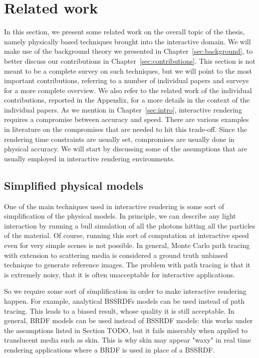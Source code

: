 \chapter{Related work}




%
\label{sec:related}
%
In this section, we present some related work on the overall topic of the thesis, namely physically based techniques brought into the interactive domain. We will make use of the background theory we presented in Chapter~\ref{sec:background}, to better discuss our contributions in Chapter~\ref{sec:contributions}. This section is not meant to be a complete survey on such techniques, but we will point to the most important contributions, referring to a number of individual papers and surveys for a more complete overview. We also refer to the related work of the individual contributions, reported in the Appendix, for a more details in the context of the individual papers. 
%
As we mention in Chapter~\ref{sec:intro}, interactive rendering requires a compromise between accuracy and speed. There are various examples in literature on the compromises that are needed to hit this trade-off. Since the rendering time constraints are usually set, compromises are usually done in physical accuracy. We will start by discussing some of the assumptions that are usually employed in interactive rendering environments. 
%
\section{Simplified physical models}
One of the main techniques used in interactive rendering is some sort of simplification of the physical models. In principle, we can describe any light interaction by running a bull simulation of all the photons hitting all the particles of the material. Of course, running this sort of computation at interactive speed even for very simple scenes is not  possible. In general, Monte Carlo path tracing with extension to scattering media is considered a ground truth unbiased technique to generate reference images. The problem with path tracing is that it is extremely noisy, that it is often unacceptable for interactive applications.

So we require some sort of simplification in order to make interactive rendering happen. For example, analytical BSSRDFs models can be used instead of path tracing. This leads to a biased result, whose quality it is still acceptable. In general, BRDF models can be used instead of BSSRDF models: this works under the assumptions listed in Section TODO, but it fails miserably when applied to translucent media such as skin. This is why skin may appear "waxy" in real time rendering applications where a BRDF is used in place of a BSSRDF. 

